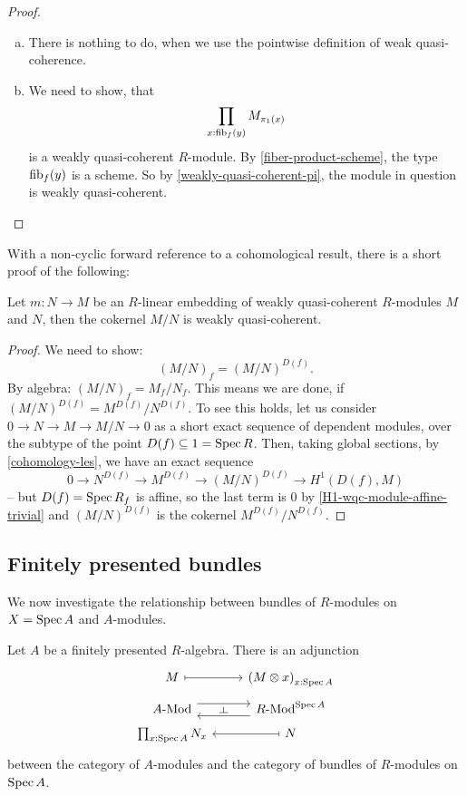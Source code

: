 \begin{proof}
  \begin{enumerate}[(a)]
  \item There is nothing to do, when we use the pointwise definition of weak quasi-coherence. 
  \item We need to show, that
    \[
      \prod_{x:\mathrm{fib}_f(y)}M_{\pi_1(x)}
    \]
    is a weakly quasi-coherent $R$-module.
    By \cref{fiber-product-scheme},
    the type $\mathrm{fib}_f(y)$ is a scheme.
    So by \cref{weakly-quasi-coherent-pi},
    the module in question is weakly quasi-coherent.
  \end{enumerate}
\end{proof}

With a non-cyclic forward reference to a cohomological result,
there is a short proof of the following:

\begin{proposition}%
  Let $m:N\to M$ be an $R$-linear embedding of weakly quasi-coherent $R$-modules $M$ and $N$,
  then the cokernel $M/N$ is weakly quasi-coherent.
\end{proposition}

\begin{proof}
  We need to show:
  \[
    (M/N)_f=(M/N)^{D(f)}.
  \]
  By algebra: $(M/N)_f=M_f/N_f$.
  This means we are done, if $(M/N)^{D(f)}=M^{D(f)}/{N^{D(f)}}$.
  To see this holds, let us consider $0\to N\to M\to M/N\to 0$ as a short exact sequence of dependent modules,
  over the subtype of the point $D(f)\subseteq 1=\operatorname{Spec} R$.
  Then, taking global sections, by \cref{cohomology-les},
  we have an exact sequence
  \[
    0\to N^{D(f)}\to M^{D(f)}\to (M/N)^{D(f)}\to H^1(D(f),M)
  \]
  -- but $D(f)=\operatorname{Spec} R_f$ is affine,
  so the last term is 0 by \cref{H1-wqc-module-affine-trivial}
  and $(M/N)^{D(f)}$ is the cokernel $M^{D(f)}/N^{D(f)}$.
\end{proof}

\subsection{Finitely presented bundles}

We now investigate the relationship between bundles of $R$-modules on $X = \operatorname{Spec} A$
and $A$-modules.

\begin{proposition}
  Let $A$ be a finitely presented $R$-algebra.
  There is an adjunction
  \[ \begin{tikzcd}[row sep=tiny]
    M \ar[r, mapsto] & {(M \otimes x)}_{x : \Spec A} \\
    \Mod{A} \ar[r, shift left=2] \ar[r, phantom, "\rotatebox{90}{$\vdash$}"] &
    \Mod{R}^{\Spec A} \ar[l, shift left=2] \\
    \prod_{x : \Spec A} N_x & N \ar[l, mapsto]
  \end{tikzcd} \]
  between the category of $A$-modules
  and the category of bundles of $R$-modules on $\operatorname{Spec} A$.
\end{proposition}

